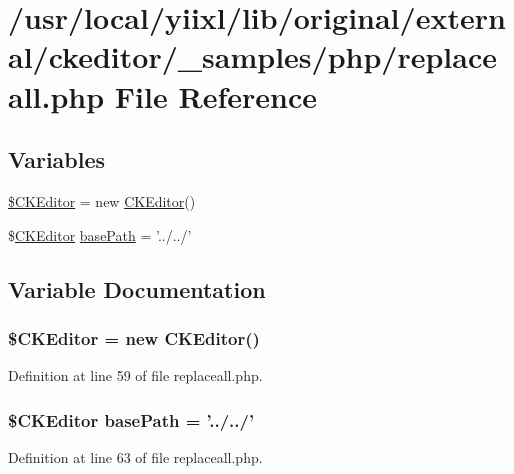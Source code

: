 \hypertarget{replaceall_8php}{
\section{/usr/local/yiixl/lib/original/external/ckeditor/\_\-samples/php/replaceall.php File Reference}
\label{replaceall_8php}
}
\subsection*{Variables}
\begin{DoxyCompactItemize}
\item 
\hyperlink{replaceall_8php_aec6d261a24c9dcb30ee1cfa7762a4a44}{\$CKEditor} = new \hyperlink{classCKEditor}{CKEditor}()
\item 
\$\hyperlink{classCKEditor}{CKEditor} \hyperlink{replaceall_8php_a94a267f018012b013582daafb6a89618}{basePath} = '../../'
\end{DoxyCompactItemize}


\subsection{Variable Documentation}
\hypertarget{replaceall_8php_aec6d261a24c9dcb30ee1cfa7762a4a44}{
\subsubsection[{\$CKEditor}]{\setlength{\rightskip}{0pt plus 5cm}\${\bf CKEditor} = new {\bf CKEditor}()}}
\label{replaceall_8php_aec6d261a24c9dcb30ee1cfa7762a4a44}


Definition at line 59 of file replaceall.php.

\hypertarget{replaceall_8php_a94a267f018012b013582daafb6a89618}{
\subsubsection[{basePath}]{\setlength{\rightskip}{0pt plus 5cm}\${\bf CKEditor} {\bf basePath} = '../../'}}
\label{replaceall_8php_a94a267f018012b013582daafb6a89618}


Definition at line 63 of file replaceall.php.

